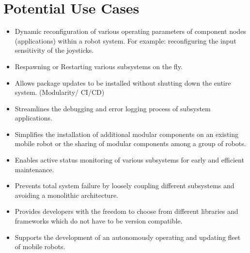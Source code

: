 \chapter{Potential Use Cases}	

\begin{itemize}
	\item  Dynamic reconfiguration of various operating parameters of component nodes (applications) within a robot system. For example: reconfiguring the input sensitivity of the joysticks.
	\item 	Respawning or Restarting various subsystems on the fly.
	\item 	Allows package updates to be installed without shutting down the entire system. (Modularity/ CI/CD)
	\item 	Streamlines the debugging and error logging process of subsystem applications.
	\item 	Simplifies the installation of additional modular components on an existing mobile robot or the sharing of modular components among a group of robots.
	\item 	Enables active status monitoring of various subsystems for early and efficient maintenance.
	\item 	Prevents total system failure by loosely coupling different subsystems and avoiding a monolithic architecture.
	\item 	Provides developers with the freedom to choose from different libraries and frameworks which do not have to be version compatible.
	\item 	Supports the development of an autonomously operating and updating fleet of mobile robots.
\end{itemize}